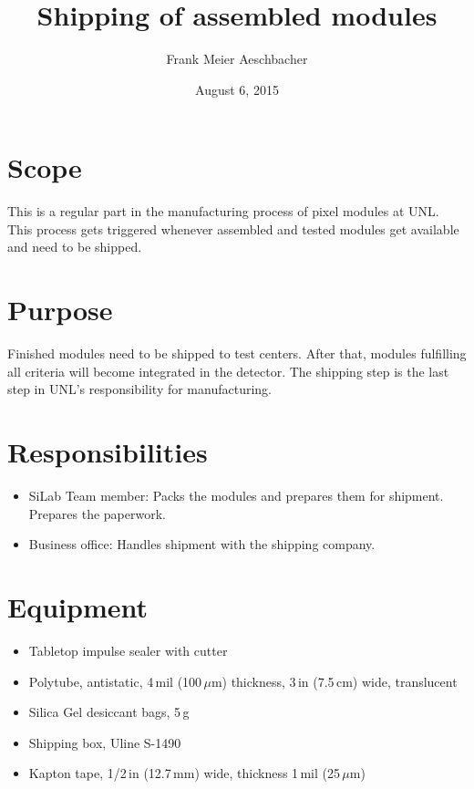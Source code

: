 \documentclass[12pt]{unlsilabsop}
\title{Shipping of assembled modules}
\date{August 6, 2015}
\author{Frank Meier Aeschbacher}
\begin{document}
\maketitle

\section{Scope}
This is a regular part in the manufacturing process of pixel modules at UNL. This process gets triggered whenever assembled and tested modules get available and need to be shipped.

\section{Purpose}
Finished modules need to be shipped to test centers. After that, modules fulfilling all criteria will become integrated in the detector. The shipping step is the last step in UNL's responsibility for manufacturing.


\section{Responsibilities}

\begin{itemize}
    \item SiLab Team member: Packs the modules and prepares them for shipment. Prepares the paperwork.
    \item Business office: Handles shipment with the shipping company.
\end{itemize}

\section{Equipment}

\begin{itemize}
    \item Tabletop impulse sealer with cutter
    \item Polytube, antistatic, 4\,mil (100\,$\mu$m) thickness, 3\,in (7.5\,cm) wide, translucent
    \item Silica Gel desiccant bags, 5\,g
    \item Shipping box, Uline S-1490
    \item Kapton tape, 1/2\,in (12.7\,mm) wide, thickness 1\,mil (25\,$\mu$m)
\end{itemize}
\end{document}
